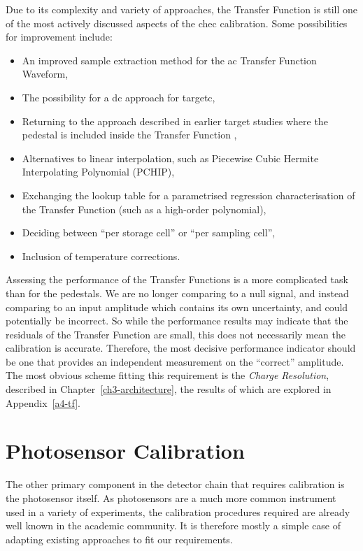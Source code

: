 Due to its complexity and variety of approaches, the Transfer Function is still one of the most actively discussed aspects of the \gls{chec} calibration. Some possibilities for improvement include:
\begin{itemize}
	\item An improved sample extraction method for the \gls{ac} Transfer Function Waveform,
	\item The possibility for a \gls{dc} approach for \gls{targetc},
	\item Returning to the approach described in earlier \gls{target} studies where the pedestal is included inside the Transfer Function \cite{Albert2017},
	\item Alternatives to linear interpolation, such as Piecewise Cubic Hermite Interpolating Polynomial (PCHIP),
	\item Exchanging the lookup table for a parametrised regression characterisation of the Transfer Function (such as a high-order polynomial),
	\item Deciding between ``per storage cell'' or ``per sampling cell'',
	\item Inclusion of temperature corrections.
\end{itemize}

Assessing the performance of the Transfer Functions is a more complicated task than for the pedestals. We are no longer comparing to a null signal, and instead comparing to an input amplitude which contains its own uncertainty, and could potentially be incorrect. So while the performance results may indicate that the residuals of the Transfer Function are small, this does not necessarily mean the calibration is accurate. Therefore, the most decisive performance indicator should be one that provides an independent measurement on the ``correct'' amplitude. The most obvious scheme fitting this requirement is the \textit{Charge Resolution}, described in Chapter~\ref{ch3-architecture}, the results of which are explored in Appendix~\ref{a4-tf}.

\section{Photosensor Calibration} \label{section:photosensor_calib}

The other primary component in the detector chain that requires calibration is the photosensor itself. As photosensors are a much more common instrument used in a variety of experiments, the calibration procedures required are already well known in the academic community. It is therefore mostly a simple case of adapting existing approaches to fit our requirements.

